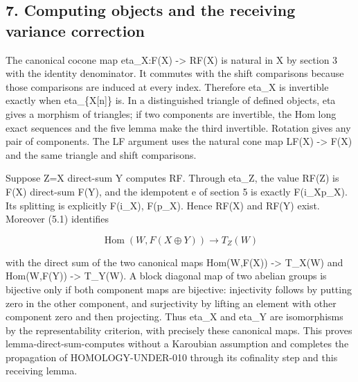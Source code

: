 \documentclass[11pt]{article}
\begin{document}
\subsection{7. Computing objects and the receiving variance correction}\label{proofs-4166-5089-computing-objects-and-the-receiving-variance-correction}

The canonical cocone map eta\_\allowbreak{}X:\allowbreak{}F(X)\allowbreak{} \allowbreak{}-> RF(X)\allowbreak{} is natural in X by section 3 with the identity denominator. It commutes with the shift comparisons because those comparisons are induced at every index. Therefore eta\_\allowbreak{}X is invertible exactly when eta\_\allowbreak{}\{X[n]\allowbreak{}\} is. In a distinguished triangle of defined objects,\allowbreak{} eta gives a morphism of triangles; if two components are invertible,\allowbreak{} the Hom long exact sequences and the five lemma make the third invertible. Rotation gives any pair of components. The LF argument uses the natural cone map LF(X)\allowbreak{} \allowbreak{}-> F(X)\allowbreak{} and the same triangle and shift comparisons.

Suppose Z\allowbreak{}=X direct-sum Y computes RF. Through eta\_\allowbreak{}Z,\allowbreak{} the value RF(Z)\allowbreak{} is F(X)\allowbreak{} direct-sum F(Y)\allowbreak{},\allowbreak{} and the idempotent e of section 5 is exactly F(i\_\allowbreak{}Xp\_\allowbreak{}X)\allowbreak{}. Its splitting is explicitly F(i\_\allowbreak{}X)\allowbreak{},\allowbreak{} F(p\_\allowbreak{}X)\allowbreak{}. Hence RF(X)\allowbreak{} and RF(Y)\allowbreak{} exist. Moreover (5.1)\allowbreak{} identifies

\[
 \operatorname{Hom}(W,F(X\oplus Y))\longrightarrow T_Z(W)
\]

with the direct sum of the two canonical maps Hom(W,\allowbreak{}F(X)\allowbreak{})\allowbreak{} \allowbreak{}-> T\_\allowbreak{}X(W)\allowbreak{} and Hom(W,\allowbreak{}F(Y)\allowbreak{})\allowbreak{} \allowbreak{}-> T\_\allowbreak{}Y(W)\allowbreak{}. A block diagonal map of two abelian groups is bijective only if both component maps are bijective:\allowbreak{} injectivity follows by putting zero in the other component,\allowbreak{} and surjectivity by lifting an element with other component zero and then projecting. Thus eta\_\allowbreak{}X and eta\_\allowbreak{}Y are isomorphisms by the representability criterion,\allowbreak{} with precisely these canonical maps. This proves lemma-direct-sum-computes without a Karoubian assumption and completes the propagation of HOMOLOGY-UNDER-010 through its cofinality step and this receiving lemma.
\end{document}
